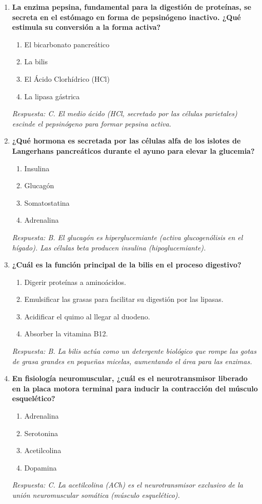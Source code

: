 \documentclass[spanish,letterpaper,oneside]{article}
\begin{document}
\begin{enumerate}[label=\textbf{\arabic*.}]
    \item \textbf{La enzima pepsina, fundamental para la digestión de proteínas, se secreta en el estómago en forma de pepsinógeno inactivo. ¿Qué estimula su conversión a la forma activa?}
    \begin{enumerate}
        \item[A)] El bicarbonato pancreático
        \item[B)] La bilis
        \item[C)] El Ácido Clorhídrico (HCl)
        \item[D)] La lipasa gástrica
    \end{enumerate}
    \textit{Respuesta: C. El medio ácido (HCl, secretado por las células parietales) escinde el pepsinógeno para formar pepsina activa.}

    \item \textbf{¿Qué hormona es secretada por las células alfa de los islotes de Langerhans pancreáticos durante el ayuno para elevar la glucemia?}
    \begin{enumerate}
        \item[A)] Insulina
        \item[B)] Glucagón
        \item[C)] Somatostatina
        \item[D)] Adrenalina
    \end{enumerate}
    \textit{Respuesta: B. El glucagón es hiperglucemiante (activa glucogenólisis en el hígado). Las células beta producen insulina (hipoglucemiante).}

    \item \textbf{¿Cuál es la función principal de la bilis en el proceso digestivo?}
    \begin{enumerate}
        \item[A)] Digerir proteínas a aminoácidos.
        \item[B)] Emulsificar las grasas para facilitar su digestión por las lipasas.
        \item[C)] Acidificar el quimo al llegar al duodeno.
        \item[D)] Absorber la vitamina B12.
    \end{enumerate}
    \textit{Respuesta: B. La bilis actúa como un detergente biológico que rompe las gotas de grasa grandes en pequeñas micelas, aumentando el área para las enzimas.}

    \item \textbf{En fisiología neuromuscular, ¿cuál es el neurotransmisor liberado en la placa motora terminal para inducir la contracción del músculo esquelético?}
    \begin{enumerate}
        \item[A)] Adrenalina
        \item[B)] Serotonina
        \item[C)] Acetilcolina
        \item[D)] Dopamina
    \end{enumerate}
    \textit{Respuesta: C. La acetilcolina (ACh) es el neurotransmisor exclusivo de la unión neuromuscular somática (músculo esquelético).}


\end{enumerate}
\end{document}
